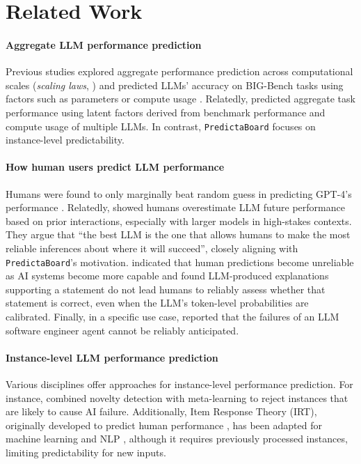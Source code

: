 \documentclass[11pt]{article}
\newcommand{\predbench}{{\tt PredictaBoard}\xspace}
\begin{document}
\section{Related Work}
\label{sec:related_works}

\paragraph{Aggregate LLM performance prediction} Previous studies explored aggregate performance prediction across computational scales (\textit{scaling laws}, \citealp{kaplan2020scaling, hernandez2020measuring}) and predicted  LLMs' accuracy on BIG-Bench \citep{srivastava2023imitationgamequantifyingextrapolating} tasks using factors such as parameters or compute usage \citep{ye2023how,owen2024predictable}. Relatedly, \citet{ruan2024observational} %
predicted aggregate task performance using latent factors derived from benchmark performance and compute usage of multiple LLMs. 
In contrast, \predbench focuses on instance-level predictability.

\paragraph{How human users predict LLM performance}
Humans were found 
to only marginally beat random guess in predicting GPT-4's performance \citep{carlini_gpt4_challenge}. 
Relatedly, \citet{vafa2024largelanguagemodelsperform} showed humans overestimate LLM future performance based on prior interactions, especially with larger models in high-stakes contexts. They argue that ``the best LLM is the one that allows humans to make the most reliable inferences about where it will succeed'', closely aligning with \predbench's motivation. \citet{zhou2024larger} indicated that human predictions become unreliable as AI systems become more capable 
and \citet{steyvers2025large} found LLM-produced explanations supporting a statement do not lead humans to reliably assess whether that statement is correct, even when the LLM's token-level probabilities are calibrated. %
Finally, in a specific use case, \citet{bansalchallenges} reported that the failures of an LLM software engineer agent cannot be reliably anticipated.

\paragraph{Instance-level LLM performance prediction}
Various disciplines offer approaches for instance-level performance prediction. For instance, \citet{drapal2024MetaLearningNoveltyDetection} combined novelty detection with meta-learning to reject instances that are likely to cause %
AI failure. Additionally, Item Response Theory (IRT), originally developed to predict human performance %
\cite{embretson2013item}, has been adapted for machine learning and NLP \cite{martinez2019item,lalor2016building,kipnis2024metabench,polo2024tinybenchmarks,vania-etal-2021-comparing}, although it requires previously processed instances, limiting predictability for new inputs. %
\end{document}
